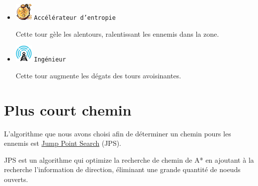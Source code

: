\documentclass{article}
\begin{document}
\begin{itemize}
\item \includegraphics{roberto.png} \texttt{Acc\'el\'erateur d'entropie}

Cette tour g\`ele les alentours, ralentissant les ennemis dans la zone.

\item \includegraphics{radar.png} \texttt{Ing\'enieur}

Cette tour augmente les d\'egats des tours avoisinantes.

\end{itemize}

\section{Plus court chemin}

L'algorithme que nous avons choisi afin de d\'eterminer un chemin pours les
ennemis est
\href{http://users.cecs.anu.edu.au/~dharabor/data/papers/harabor-grastien-aaai11.pdf}
{Jump Point Search} (JPS).

JPS est un algorithme qui optimize la recherche de chemin de A* en ajoutant
\`a la recherche  l'information de direction, \'eliminant une grande quantit\'e
de noeuds ouverts.
\end{document}
